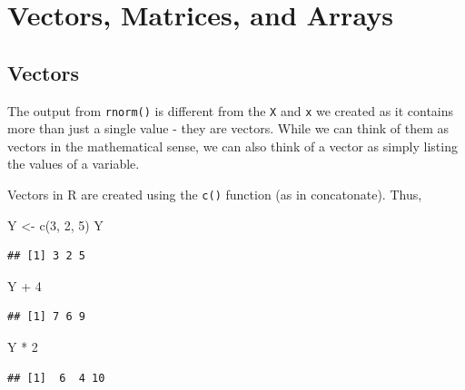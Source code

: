 \documentclass[
]{book}
\newenvironment{Shaded}{\begin{snugshade}}{\end{snugshade}}
\newcommand{\DecValTok}[1]{\textcolor[rgb]{0.00,0.00,0.81}{#1}}
\newcommand{\FunctionTok}[1]{\textcolor[rgb]{0.00,0.00,0.00}{#1}}
\newcommand{\NormalTok}[1]{#1}
\newcommand{\OtherTok}[1]{\textcolor[rgb]{0.56,0.35,0.01}{#1}}
\newcommand{\SpecialCharTok}[1]{\textcolor[rgb]{0.00,0.00,0.00}{#1}}
\begin{document}
\hypertarget{vectors-matrices-and-arrays}{%
\section{Vectors, Matrices, and Arrays}\label{vectors-matrices-and-arrays}}

\hypertarget{vectors}{%
\subsection*{Vectors}\label{vectors}}

The output from \texttt{rnorm()} is different from the \texttt{X} and \texttt{x} we created as it contains more than just a single value - they are vectors. While we can think of them as vectors in the mathematical sense, we can also think of a vector as simply listing the values of a variable.

Vectors in R are created using the \texttt{c()} function (as in concatonate). Thus,

\begin{Shaded}
\begin{Highlighting}[]
\NormalTok{Y }\OtherTok{\textless{}{-}} \FunctionTok{c}\NormalTok{(}\DecValTok{3}\NormalTok{, }\DecValTok{2}\NormalTok{, }\DecValTok{5}\NormalTok{)}
\NormalTok{Y}
\end{Highlighting}
\end{Shaded}

\begin{verbatim}
## [1] 3 2 5
\end{verbatim}

\begin{Shaded}
\begin{Highlighting}[]
\NormalTok{Y }\SpecialCharTok{+} \DecValTok{4}
\end{Highlighting}
\end{Shaded}

\begin{verbatim}
## [1] 7 6 9
\end{verbatim}

\begin{Shaded}
\begin{Highlighting}[]
\NormalTok{Y }\SpecialCharTok{*} \DecValTok{2}
\end{Highlighting}
\end{Shaded}

\begin{verbatim}
## [1]  6  4 10
\end{verbatim}
\end{document}
